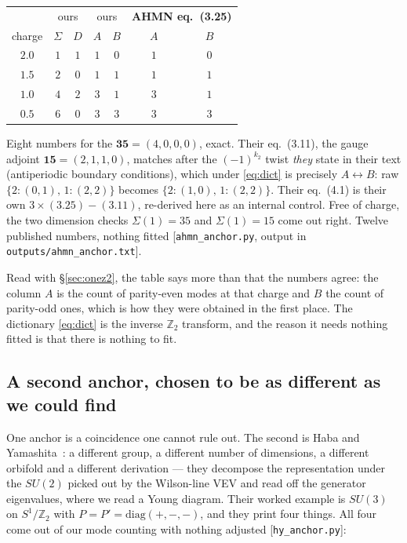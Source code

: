 \documentclass[11pt,a4paper]{article}
\newcommand{\ZZ}{\mathbb{Z}}
\newcommand{\su}[1]{SU(#1)}
\begin{document}
\begin{center}\small
{}
\begin{tabular}{c cc cc cc}
\toprule
\rowcolor{hdrblue!14}
& \multicolumn{2}{c}{ours} & \multicolumn{2}{c}{ours} &
\multicolumn{2}{c}{\textbf{AHMN eq.~(3.25)}}\\
\rowcolor{hdrblue!14}
charge & $\Sigma$ & $D$ & $A$ & $B$ & $A$ & $B$\\
\midrule
$2.0$ & $1$ & $1$ & $1$ & $0$ & $1$ & $0$\\
$1.5$ & $2$ & $0$ & $1$ & $1$ & $1$ & $1$\\
$1.0$ & $4$ & $2$ & $3$ & $1$ & $3$ & $1$\\
$0.5$ & $6$ & $0$ & $3$ & $3$ & $3$ & $3$\\
\bottomrule
\end{tabular}
\end{center}

\noindent Eight numbers for the $\mathbf{35}=(4,0,0,0)$, exact. Their eq.~(3.11), the gauge adjoint
$\mathbf{15}=(2,1,1,0)$, matches after the $(-1)^{k_2}$ twist \emph{they} state in their text
(antiperiodic boundary conditions), which under \eqref{eq:dict} is precisely $A\leftrightarrow B$:
raw $\{2:(0,1),\,1:(2,2)\}$ becomes $\{2:(1,0),\,1:(2,2)\}$. Their eq.~(4.1) is their own
$3\times(3.25)-(3.11)$, re-derived here as an internal control. Free of charge, the two dimension
checks $\Sigma(1)=35$ and $\Sigma(1)=15$ come out right. Twelve published numbers, nothing fitted
[\texttt{ahmn\_anchor.py}, output in \texttt{outputs/ahmn\_anchor.txt}].

Read with \S\ref{sec:onez2}, the table says more than that the numbers agree: the column $A$ is the
count of parity-even modes at that charge and $B$ the count of parity-odd ones, which is how they
were obtained in the first place. The dictionary \eqref{eq:dict} is the inverse $\ZZ_2$ transform,
and the reason it needs nothing fitted is that there is nothing to fit.

\subsection*{A second anchor, chosen to be as different as we could find}

One anchor is a coincidence one cannot rule out. The second is Haba and Yamashita~\cite{HY}: a
different group, a different number of dimensions, a different orbifold and a different derivation
--- they decompose the representation under the $SU(2)$ picked out by the Wilson-line VEV and read
off the generator eigenvalues, where we read a Young diagram. Their worked example is $\su3$ on
$S^1/\ZZ_2$ with $P=P'=\mathrm{diag}(+,-,-)$, and they print four things. All four come out of our
mode counting with nothing adjusted [\texttt{hy\_anchor.py}]:
\end{document}

